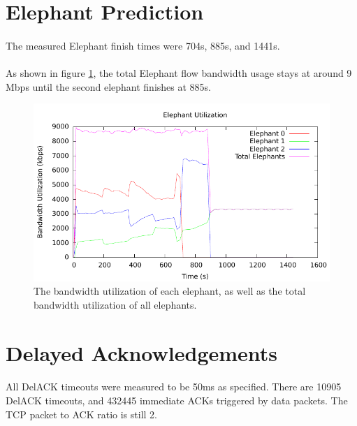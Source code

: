 \documentclass{article}
\begin{document}
  \section{Elephant Prediction}
    \paragraph{}
      The measured Elephant finish times were 704s, 885s, and 1441s.

    \paragraph{}
      As shown in figure \ref{fig:elephant_bw}, the total Elephant flow bandwidth usage stays at around 9 Mbps until the second elephant finishes at 885s.
    \begin{figure}[h]
      \begin{center}
        \includegraphics{elephant_bw}
        \caption{The bandwidth utilization of each elephant, as well as the total bandwidth utilization of all elephants.}
        \label{fig:elephant_bw}
      \end{center}
    \end{figure}

  \section{Delayed Acknowledgements}
    \paragraph{}
      All DelACK timeouts were measured to be 50ms as specified.
      There are 10905 DelACK timeouts, and 432445 immediate ACKs triggered by data packets.
      The TCP packet to ACK ratio is still 2.
\end{document}
